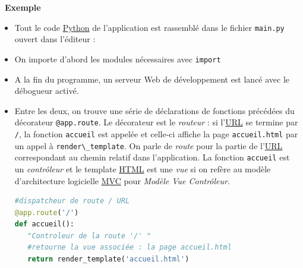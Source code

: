 \documentclass[
  11pt,
]{article}
\newcommand{\passthrough}[1]{#1}
\newcounter{def}
\newcounter{exple}
\newenvironment{exemple}[1]
{\par \medskip   \addtocounter{exple}{1} \noindent  
\begin{bclogo}[arrondi =0.1,   noborder = true, logo=\bclampe, marge=4]{~\textbf{Exemple} \textbf{\theexple} {\itshape #1} }  \par}
{
\end{bclogo}
 \par \bigskip }
\newcounter{prog}
\newcounter{logi}
\begin{document}
\begin{exemple}{}
\begin{enumerate}
  \begin{itemize}
  \item
    Tout le code
    \href{https://docs.python.org/3.7/library/cgi.html}{Python} de
    l'application est rassemblé dans le fichier
    \passthrough{\lstinline!main.py!} ouvert dans l'éditeur :
  \item
    On importe d'abord les modules nécessaires avec
    \passthrough{\lstinline!import!}
  \item
    A la fin du programme, un serveur Web de développement est lancé
    avec le débogueur activé.
  \item
    Entre les deux, on trouve une série de déclarations de fonctions
    précédées du décorateur \passthrough{\lstinline!@app.route!}. Le
    décorateur est le \emph{routeur} : si
    l'\href{https://developer.mozilla.org/fr/docs/Glossaire/URL}{URL} se
    termine par \passthrough{\lstinline!/!}, la fonction
    \passthrough{\lstinline!accueil!} est appelée et celle-ci affiche la
    page \passthrough{\lstinline!accueil.html!} par un appel à
    \passthrough{\lstinline!render\_template!}. On parle de \emph{route}
    pour la partie de
    l'\href{https://developer.mozilla.org/fr/docs/Glossaire/URL}{URL}
    correspondant au chemin relatif dans l'application. La fonction
    \passthrough{\lstinline!accueil!} est un \emph{contrôleur} et le
    template
    \href{https://developer.mozilla.org/fr/docs/Glossaire/HTML}{HTML}
    est une \emph{vue} si on refère au modèle d'architecture logicielle
    \href{https://developer.mozilla.org/fr/docs/Glossaire/MVC}{MVC} pour
    \emph{Modèle Vue Contrôleur}.

\begin{lstlisting}[language=Python]
#dispatcheur de route / URL
@app.route('/')
def accueil():
   "Controleur de la route '/' "
   #retourne la vue associée : la page accueil.html
   return render_template('accueil.html')
\end{lstlisting}


\end{itemize}
\end{enumerate}
\end{exemple}
\end{document}
